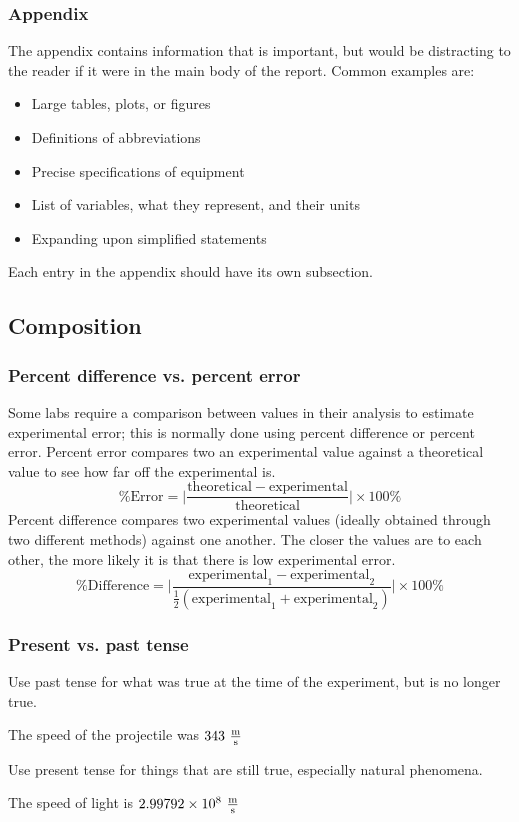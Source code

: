 \documentclass{bannerReport}
\begin{document}
			\subsubsection{Appendix}
				The appendix contains information that is important, but would be distracting to the reader if it were in the main body of the report. Common examples are:
				\begin{itemize}
					\item Large tables, plots, or figures
					\item Definitions of abbreviations
					\item Precise specifications of equipment
					\item List of variables, what they represent, and their units
					\item Expanding upon simplified statements
				\end{itemize}
				Each entry in the appendix should have its own subsection.

		\subsection{Composition}
			\subsubsection{Percent difference vs. percent error}
				Some labs require a comparison between values in their analysis to estimate experimental error; this is normally done using percent difference or percent error.
				Percent error compares two an experimental value against a theoretical value to see how far off the experimental is.
				$$
					\mathrm{\% Error} = \bigg| \frac{ \mathrm{theoretical} - \mathrm{experimental} }{\mathrm{theoretical}} \bigg| \times 100 \%
				$$
				Percent difference compares two experimental values (ideally obtained through two different methods) against one another. The closer the values are to each other, the more likely it is that there is low experimental error.
				$$
					\mathrm{\% Difference} = \bigg| \frac{ \mathrm{experimental}_1 - \mathrm{experimental}_2}{ \frac{1}{2}(\mathrm{experimental}_1 + \mathrm{experimental}_2)} \bigg| \times 100 \%
				$$

				\newpage

			\subsubsection{Present vs. past tense}
				Use past tense for what was true at the time of the experiment, but is no longer true.
				\vspace{-.1cm}
				\begin{dent}
					The speed of the projectile was $343 \text{ }{\text{m} \over \text{s}}$
				\end{dent}
				Use present tense for things that are still true, especially natural phenomena.
				\vspace{-.1cm}
				\begin{dent}
					The speed of light is $2.99 792 \times 10^8 \text{ }{\text{m} \over \text{s}}$
				\end{dent}
		
\end{document}
